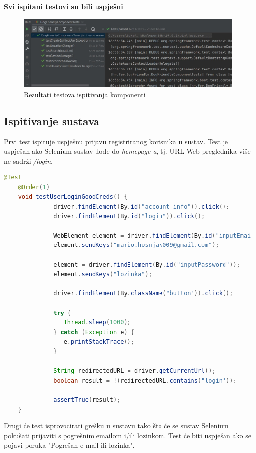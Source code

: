     \eject
    \textbf{Svi ispitani testovi su bili uspješni}

    \begin{figure}[H]
        \includegraphics[width=\textwidth]{img/Ispitivanje komponentni.jpg}
        \centering
        \caption{Rezultati testova ispitivanja komponenti}
    \end{figure}

    \subsection{Ispitivanje sustava}

    Prvi test ispituje uspješnu prijavu registriranog korisnika u sustav. Test je uspješan ako Selenium sustav dođe do \textit{homepage-a}, tj. URL Web preglednika više ne sadrži \textit{/login}.

    \begin{lstlisting}[language=Java,breaklines=true]
    @Test
    @Order(1)
    void testUserLoginGoodCreds() {
		      driver.findElement(By.id("account-info")).click();
		      driver.findElement(By.id("login")).click();

		      WebElement element = driver.findElement(By.id("inputEmail"));
		      element.sendKeys("mario.hosnjak009@gmail.com");

		      element = driver.findElement(By.id("inputPassword"));
		      element.sendKeys("lozinka");

		      driver.findElement(By.className("button")).click();

		      try {
			     Thread.sleep(1000);
		      } catch (Exception e) {
			     e.printStackTrace();
		      }

		      String redirectedURL = driver.getCurrentUrl();
		      boolean result = !(redirectedURL.contains("login"));

		      assertTrue(result);
	}
    \end{lstlisting}

    Drugi će test isprovocirati grešku u sustavu tako što će se sustav Selenium pokušati prijaviti s pogrešnim emailom i/ili lozinkom. Test će biti uspješan ako se pojavi poruka "Pogrešan e-mail ili lozinka".

